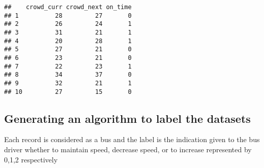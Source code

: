 \documentclass[
]{article}
\begin{document}
\begin{verbatim}
##    crowd_curr crowd_next on_time
## 1          28         27       0
## 2          26         24       1
## 3          31         21       1
## 4          20         28       1
## 5          27         21       0
## 6          23         21       0
## 7          22         23       1
## 8          34         37       0
## 9          32         21       1
## 10         27         15       0
\end{verbatim}

\hypertarget{generating-an-algorithm-to-label-the-datasets}{%
\subsection{Generating an algorithm to label the
datasets}\label{generating-an-algorithm-to-label-the-datasets}}

Each record is considered as a bus and the label is the indication given
to the bus driver whether to maintain speed, decrease speed, or to
increase represented by 0,1,2 respectively
\end{document}

